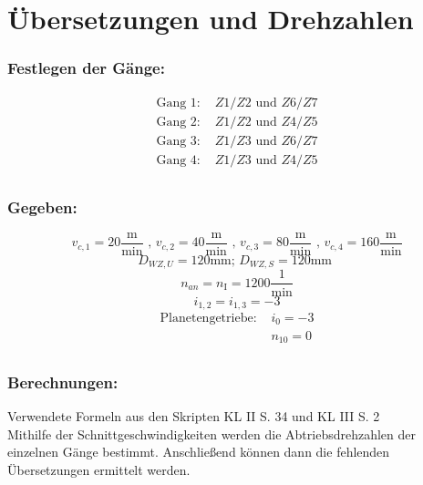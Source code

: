 \section{Übersetzungen und Drehzahlen}
\subsubsection{Festlegen der Gänge: }
\begin{align*}
\text{Gang 1: }& Z1/Z2 \text{ und } Z6/Z7 \\
\text{Gang 2: }& Z1/Z2 \text{ und } Z4/Z5 \\
\text{Gang 3: }& Z1/Z3 \text{ und } Z6/Z7 \\
\text{Gang 4: }& Z1/Z3 \text{ und } Z4/Z5 \\
\end{align*}
\subsubsection{Gegeben: }
\begin{center}
\[
	v_{c,1} = 20 \frac{\text{m}}{\text{min}} \text{ , } v_{c,2} = 40 \frac{\text{m}}{\text{min}} \text{ , } v_{c,3} = 80 \frac{\text{m}}{\text{min}} \text{ , } v_{c,4} = 160 \frac{\text{m}}{\text{min}}
\]
\[
	D_{WZ,U} = 120 \text{mm; }
	D_{WZ,S} = 120 \text{mm }
\]
\[
	n_{an} = n_{\mathord{\mathrm{I}}}= 1200 \frac{1}{\text{min}}
\]
\[
	i_{1,2} =  i_{1,3} = -3
\]
 \begin{align*}
\text{Planetengetriebe: }
		&i_{0} = -3 \\	
		&n_{10} = 0\\
\end{align*}
\subsubsection{Berechnungen:}
\end{center}
Verwendete Formeln aus den Skripten KL II S. 34 und KL III S. 2 \\
Mithilfe der Schnittgeschwindigkeiten werden die Abtriebsdrehzahlen der einzelnen Gänge bestimmt. Anschließend können dann die fehlenden Übersetzungen ermittelt werden.
